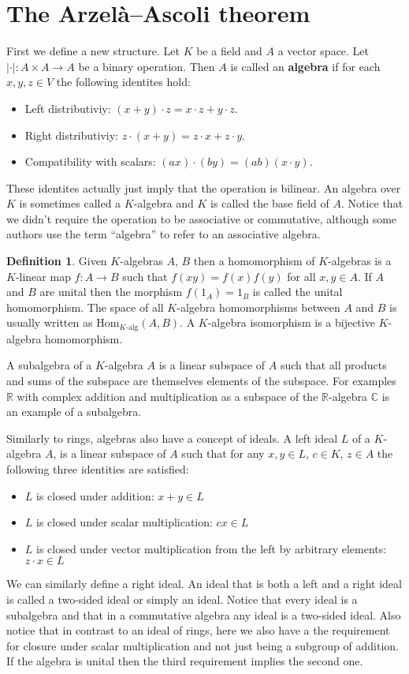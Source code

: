 \documentclass[11pt,a4paper]{article}
\theoremstyle{definition}
\newtheorem{definition}{Definition}[section]
\theoremstyle{plain}
\newcommand{\R}{\mathbb{R}}
\newcommand{\C}{\mathbb{C}}
\begin{document}
	\section{The Arzelà–Ascoli theorem}
	First we define a new structure. Let $K$ be a field and $A$ a vector 
	space. Let $|\cdot| \colon A \times A \to A$ be a binary operation.
	Then $A$ is called an \textbf{algebra} if for each $x,y,z \in V$ 
	the following identites hold:
	\begin{itemize}
		\item Left distributiviy: $(x + y) \cdot z = x \cdot z + y \cdot z$.
		\item Right distributiviy: $z \cdot (x + y) = z \cdot x + z \cdot y$.
		\item Compatibility with scalars: 
		$(ax) \cdot (by) = (ab) (x \cdot y)$.
	\end{itemize}
	These identites actually just imply that the operation is bilinear.
	An algebra over $K$ is sometimes called a $K$-algebra and $K$ is
	called the base field of $A$. Notice that we didn't require the operation
	to be associative or commutative, although some authors use the term
	``algebra'' to refer to an associative algebra.
	\begin{definition}
		Given $K$-algebras $A$, $B$ then a homomorphism of $K$-algebras
		is a $K$-linear map $f \colon A \to B$ such that $f(xy)=f(x)f(y)$
		for all $x,y \in A$. If $A$ and $B$ are unital then the morphism
		$f(1_A) = 1_B$ is called the unital homomorphism. The space
		of all $K$-algebra homomorphisms between $A$ and $B$ is usually 
		written as ${\mathrm{Hom}}_{K\text{-alg}}(A,B)$. A $K$-algebra
		isomorphism is a bijective $K$-algebra homomorphism.
	\end{definition}
	A subalgebra of a $K$-algebra $A$ is a linear subspace of $A$ such
	that all products and sums of the subspace are themselves elements
	of the subspace. For examples $\R$ with complex addition and 
	multiplication as a subspace of the $\R$-algebra $\C$ is an example
	of a subalgebra.
	
	Similarly to rings, algebras also have a concept of ideals. A left ideal
	$L$ of a $K$-algebra $A$, is a linear subspace of $A$ such that for
	any $x,y \in L$, $c \in K$, $z \in A$ the following three identities
	are satisfied:
	\begin{itemize}
		\item $L$ is closed under addition: $x + y \in L$
		\item $L$ is closed under scalar multiplication: $cx \in L$
		\item $L$ is closed under vector multiplication from the left
		by arbitrary elements: $z \cdot x \in L$
	\end{itemize}
	We can similarly define a right ideal. An ideal that is both a left and
	a right ideal is called a two-sided ideal or simply an ideal. Notice
	that every ideal is a subalgebra and that in a commutative algebra
	any ideal is a two-sided ideal. Also notice that in contrast to an
	ideal of rings, here we also have a the requirement for closure under
	scalar multiplication and not just being a subgroup of addition.
	If the algebra is unital then the third requirement implies the second
	one.
	
\end{document}
